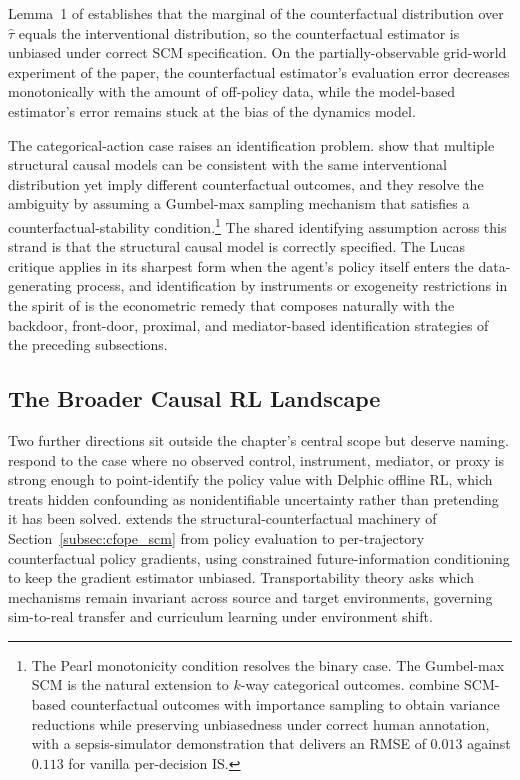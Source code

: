 Lemma~1 of \citet{buesing2019woulda} establishes that the marginal of the counterfactual distribution over $\hat\tau$ equals the interventional distribution, so the counterfactual estimator is unbiased under correct SCM specification. On the partially-observable grid-world experiment of the paper, the counterfactual estimator's evaluation error decreases monotonically with the amount of off-policy data, while the model-based estimator's error remains stuck at the bias of the dynamics model.

The categorical-action case raises an identification problem. \citet{oberst2019counterfactual} show that multiple structural causal models can be consistent with the same interventional distribution yet imply different counterfactual outcomes, and they resolve the ambiguity by assuming a Gumbel-max sampling mechanism that satisfies a counterfactual-stability condition.\footnote{The Pearl monotonicity condition resolves the binary case. The Gumbel-max SCM is the natural extension to $k$-way categorical outcomes. \citet{TangWiens2023} combine SCM-based counterfactual outcomes with importance sampling to obtain variance reductions while preserving unbiasedness under correct human annotation, with a sepsis-simulator demonstration that delivers an RMSE of $0.013$ against $0.113$ for vanilla per-decision IS.} The shared identifying assumption across this strand is that the structural causal model is correctly specified. The Lucas critique applies in its sharpest form when the agent's policy itself enters the data-generating process, and identification by instruments or exogeneity restrictions in the spirit of \citet{Chernozhukov2018} is the econometric remedy that composes naturally with the backdoor, front-door, proximal, and mediator-based identification strategies of the preceding subsections.

\subsection{The Broader Causal RL Landscape}
\label{subsec:causal_rl_landscape}

Two further directions sit outside the chapter's central scope but deserve naming. \citet{paceEtAl2024delphic} respond to the case where no observed control, instrument, mediator, or proxy is strong enough to point-identify the policy value with Delphic offline RL, which treats hidden confounding as nonidentifiable uncertainty rather than pretending it has been solved. \citet{mesnardEtAl2021counterfactual} extends the structural-counterfactual machinery of Section~\ref{subsec:cfope_scm} from policy evaluation to per-trajectory counterfactual policy gradients, using constrained future-information conditioning to keep the gradient estimator unbiased. Transportability theory \citep{pearl2014external,bareinboim2016causal,liZhangBareinboim2024curriculum} asks which mechanisms remain invariant across source and target environments, governing sim-to-real transfer and curriculum learning under environment shift.

